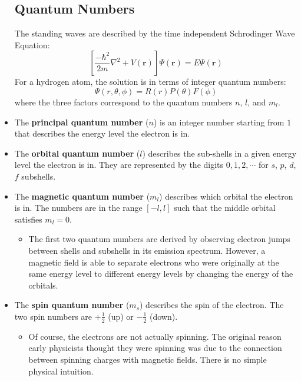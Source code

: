 \documentclass{article}
\numberwithin{equation}{section}
\theoremstyle{classic}
\begin{document}
\begin{itemize}
    \subsection{Quantum Numbers}
    \begin{idea}
        The standing waves are described by the time independent Schrodinger Wave Equation:
        $${\displaystyle \left[{\frac {-\hbar ^{2}}{2m}}\nabla ^{2}+V(\mathbf {r} )\right]\Psi (\mathbf {r} )=E\Psi (\mathbf {r} )}$$
        For a hydrogen atom, the solution is in terms of integer quantum numbers:
        $$\Psi(r,\theta,\phi) =  R(r)P(\theta)F(\phi)$$
        where the three factors correspond to the quantum numbers $n$, $l$, and $m_l$.
    \end{idea}
    \item The \textbf{principal quantum number} ($n$) is an integer number starting from $1$ that describes the energy level the electron is in.
    \item The \textbf{orbital quantum number} ($l$) describes the sub-shells in a given energy level the electron is in. They are represented by the digits $0,1,2,\cdots$ for $s$, $p$, $d$, $f$ subshells.
    \item The \textbf{magnetic quantum number} ($m_l$) describes which orbital the electron is in. The numbers are in the range $[-l,l]$ such that the middle orbital satisfies $m_l=0$.
    \begin{itemize}
        \item The first two quantum numbers are derived by observing electron jumps between shells and subshells in its emission spectrum. However, a magnetic field is able to separate electrons who were originally at the same energy level to different energy levels by changing the energy of the orbitals.
    \end{itemize}
    \item The \textbf{spin quantum number} ($m_s$) describes the spin of the electron. The two spin numbers are $+\frac{1}{2}$ (up) or $-\frac{1}{2}$ (down).
    \begin{itemize}
        \item Of course, the electrons are not actually spinning. The original reason early physicists thought they were spinning was due to the connection between spinning charges with magnetic fields. There is no simple physical intuition.
    \end{itemize}

\end{itemize}
\end{document}
